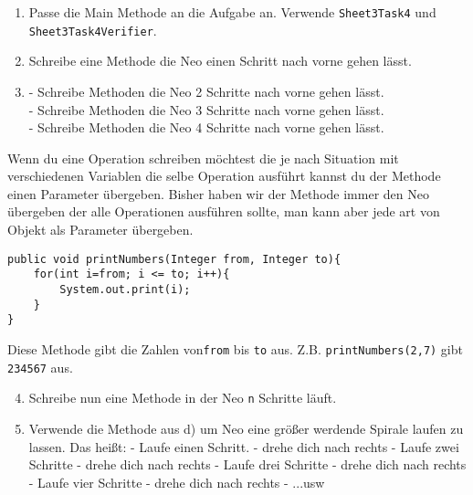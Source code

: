 
\begin{enumerate}
	\item 
		Passe die Main Methode an die Aufgabe an. Verwende \lstinline{Sheet3Task4} und \lstinline{Sheet3Task4Verifier}.
	\item 
		Schreibe eine Methode die Neo einen Schritt nach vorne gehen lässt.
	\item 
		- Schreibe Methoden die Neo 2 Schritte nach vorne gehen lässt.\\
		- Schreibe Methoden die Neo 3 Schritte nach vorne gehen lässt.\\
		- Schreibe Methoden die Neo 4 Schritte nach vorne gehen lässt.
\end{enumerate}

\begin{Infobox}
	Wenn du eine Operation schreiben möchtest die je nach Situation mit verschiedenen Variablen die selbe Operation ausführt kannst du der Methode einen Parameter übergeben. 
	Bisher haben wir der Methode immer den Neo übergeben der alle Operationen ausführen sollte, man kann aber jede art von Objekt als Parameter übergeben.
	
	\begin{lstlisting}
public void printNumbers(Integer from, Integer to){
    for(int i=from; i <= to; i++){
        System.out.print(i);
    }
}
	\end{lstlisting}

	Diese Methode gibt die Zahlen von\lstinline{from} bis \lstinline{to} aus. 
	Z.B. \lstinline{printNumbers(2,7)} gibt \lstinline{234567} aus.
\end {Infobox}


\begin{enumerate}\setcounter{enumi}{3}
	\item
		Schreibe nun eine Methode in der Neo \lstinline{n} Schritte läuft.

	\item
		Verwende die Methode aus d) um Neo eine größer werdende Spirale laufen zu lassen. Das heißt:
		- Laufe einen Schritt.
		- drehe dich nach rechts
		- Laufe zwei Schritte
		- drehe dich nach rechts
		- Laufe drei Schritte
		- drehe dich nach rechts
		- Laufe vier Schritte
		- drehe dich nach rechts
		- ...usw
\end{enumerate}

\newpage
